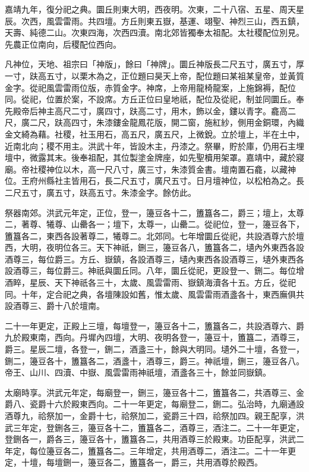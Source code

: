 嘉靖九年，復分祀之典。圜丘則東大明，西夜明。次東，二十八宿、五星、周天星辰。次西，風雲雷雨。共四壇。方丘則東五嶽，基運、翊聖、神烈三山，西五鎮，天壽、純德二山。次東四海，次西四瀆。南北郊皆獨奉太祖配。太社稷配位別見。先農正位南向，后稷配位西向。

凡神位，天地、祖宗曰「神版」，餘曰「神牌」。圜丘神版長二尺五寸，廣五寸，厚一寸，趺高五寸，以栗木為之，正位題曰昊天上帝，配位題曰某祖某皇帝，並黃質金字。從祀風雲雷雨位版，赤質金字。神席，上帝用龍椅龍案，上施錦褥，配位同。從祀，位置於案，不設席。方丘正位曰皇地祇，配位及從祀，制並同圜丘。奉先殿帝后神主高尺二寸，廣四寸，趺高二寸，用木，飾以金，鏤以青字。龕高二尺，廣二尺，趺高四寸，朱漆鏤金龍鳳花版，開二窗，施紅紗，側用金銅環，內織金文綺為藉。社稷，社玉用石，高五尺，廣五尺，上微銳。立於壇上，半在土中，近南北向；稷不用主。洪武十年，皆設木主，丹漆之。祭畢，貯於庫，仍用石主埋壇中，微露其末。後奉祖配，其位製塗金牌座，如先聖櫝用架罩。嘉靖中，藏於寢廟。帝社稷神位以木，高一尺八寸，廣三寸，朱漆質金書。壇南置石龕，以藏神位。王府州縣社主皆用石，長二尺五寸，廣尺五寸。日月壇神位，以松柏為之。長二尺五寸，廣五寸，趺高五寸。朱漆金字。餘仿此。

祭器南郊。洪武元年定，正位，登一，籩豆各十二，簠簋各二，爵三；壇上，太尊二，著尊、犧尊、山罍各一；壇下，太尊一，山罍二。從祀位，登一，籩豆各下，簠簋各二，東西各設著尊二，犧尊二。北郊同。七年增圜丘從祀，共設酒尊六於壇西，大明，夜明位各三。天下神祇，鉶三，籩豆各八，簠簋各二，壝內外東西各設酒尊三，每位爵三。方丘、嶽鎮，各設酒尊三，壝內東西各設酒尊三，壝外東西各設酒尊三，每位爵三。神祇與圜丘同。八年，圜丘從祀，更設登一、鉶二。每位增酒睟，星辰、天下神祇各三十，太歲、風雲雷雨、嶽鎮海瀆各十五。方丘，從祀同。十年，定合祀之典，各壇陳設如舊，惟太歲、風雲雷雨酒盞各十，東西廡俱共設酒尊三、爵十八於壇南。

二十一年更定，正殿上三壇，每壇登一，籩豆各十二，簠簋各二，共設酒尊六、爵九於殿東南，西向。丹墀內四壇，大明、夜明各登一，籩豆十，簠簋二，酒尊三，爵三。星辰二壇，各登一，鉶二，酒盞三十，餘與大明同。壝外二十壇，各登一，鉶二，籩豆各十，簠簋各二，酒盞十，酒尊三，爵三。神祇壇，鉶三，籩豆各八。帝王、山川、四瀆、中嶽、風雲雷雨神祇壇，酒盞各三十，餘並同嶽鎮。

太廟時享。洪武元年定，每廟登一，鉶三，籩豆各十二，簠簋各二，共酒尊三、金爵八、瓷爵十六於殿東西向。二十一年更定，每廟登二，鉶二。弘治時，九廟通設酒尊九，祫祭加一，金爵十七，祫祭加二，瓷爵三十四，祫祭加四。親王配享，洪武三年定，登鉶各三，籩豆各十二，簠簋各二，酒尊三，酒注二。二十一年更定，登鉶各一，爵各三，籩豆各十，簠簋各二，共用酒尊三於殿東。功臣配享，洪武二年定，每位籩豆各二，簠簋各二。三年增定，共用酒尊二，酒注二。二十一年更定，十壇，每壇鉶一，籩豆各二，簠簋各一，爵三，共用酒尊於殿西。

